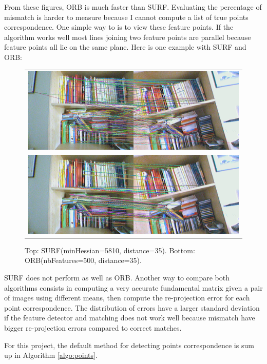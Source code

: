 \documentclass[11pt]{report}
\begin{document}
From these figures, ORB is much faster than SURF. Evaluating the percentage of mismatch is harder to measure because I cannot compute a list of true points correspondence. One simple way to is to view these feature points. If the algorithm works well most lines joining two feature points are parallel because feature points all lie on the same plane. Here is one example with SURF and ORB:

\begin{figure}[H]
\begin{tabular}{c}
\includegraphics[scale=0.3]{images/surf_bad.png} \\
\includegraphics[scale=0.3]{images/orb_good.png} \\
\end{tabular}
\caption{Top: SURF(minHessian=5810, distance=35). Bottom: ORB(nbFeatures=500, distance=35).}
\end{figure}

SURF does not perform as well as ORB. Another way to compare both algorithms consists in computing a very accurate fundamental matrix given a pair of images using different means, then compute the re-projection error for each point correspondence. The distribution of errors have a larger standard deviation if the feature detector and matching does not work well because mismatch have bigger re-projection errors compared to correct matches.

For this project, the default method for detecting points correspondence is sum up in Algorithm \ref{algo:points}.
\end{document}
